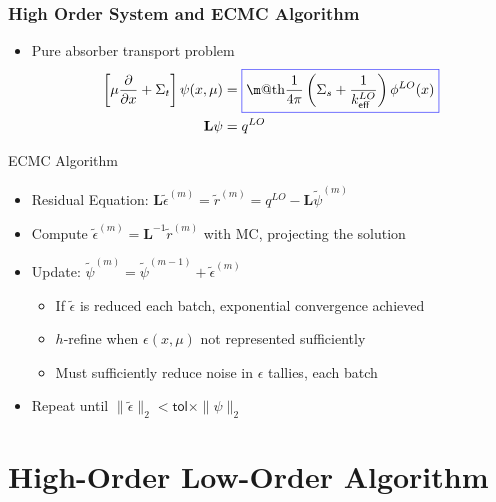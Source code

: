 \documentclass[xcolor=dvipsnames,handout]{beamer}
\makeatletter
\newcommand*{\boxedcolor}{blue}
\renewcommand{\boxed}[1]{\textcolor{\boxedcolor}{%
  \fbox{\normalcolor\m@th$\displaystyle#1$}}}
\newcommand{\keff}[0]{\ensuremath{{k}_{\textsf{eff}}} }
\newcommand{\colb}[1]{{\color{blue} #1}}
\newlength{\wideitemsep}
\let\olditem\item
\renewcommand{\item}{\setlength{\itemsep}{\wideitemsep}\olditem}
\newcommand{\pderiv}[2]{\frac{\partial #1}{\partial #2}}
\newcommand{\B}[1]{\ensuremath{\mathbf{#1}}}
\makeatother
\begin{document}
\begin{frame}
    \frametitle{High Order System and ECMC Algorithm}
    \begin{itemize}
        \item \colb{Pure absorber} transport problem
        \begin{align*}
            \left[\mu \pderiv{}{x} + \Sigma_t\right]\psi(x,\mu)
            &= \boxed{\frac{1}{4\pi}\left(\Sigma_s + \frac{1}{\keff^{LO}}\right)
        \phi^{LO}(x)} \\
         \B L \psi &= q^{LO}
     \end{align*}
        \vspace{-0.3in}
        \end{itemize}
        \begin{block}{ECMC Algorithm}
         \begin{itemize}
        \item Residual Equation: $\displaystyle \B L \tilde 
            \epsilon^{(m)} =
            \tilde r^{(m)} = q^{LO} - \B L \tilde\psi^{(m)}$
            \vspace{0.01in}
        \item Compute $\tilde{\epsilon}^{(m)} = \B L^{-1} \tilde{r}^{(m)}$ with MC,
            \colb{projecting} the solution  
        \item Update: $\tilde\psi^{(m)} = \tilde\psi^{(m-1)} + \tilde \epsilon^{(m)}$
        \begin{itemize}
            \item If $\tilde{\epsilon}$ is reduced each batch, \colb{exponential convergence
                achieved}
            \item $h$-refine when $\epsilon(x,\mu)$ not represented sufficiently
             \item Must sufficiently reduce noise in $\epsilon$ tallies, each batch
        \end{itemize}
    \item Repeat until $\| \tilde \epsilon \|_2 < \textsf{tol}\times \| \psi \|_2$
    \end{itemize}
\end{block}

\end{frame}

\section{High-Order Low-Order Algorithm}
\end{document}
